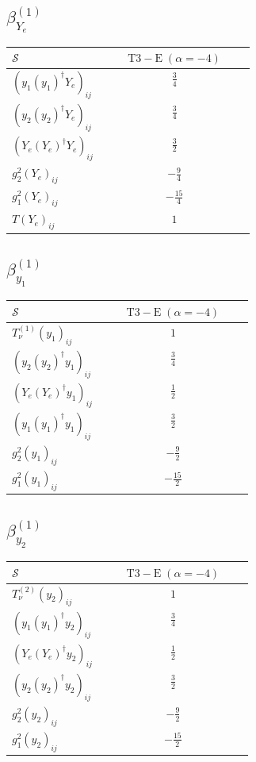 \documentclass[9pt]{article}
\begin{document}
\subsection*{$ \beta_{Y_e}^{(1)} $}
\begin{longtable}{@{}p{0.38\linewidth}c@{}}
\toprule
$\mathcal{S}$ & $ \mathrm{T3-E}\;(\alpha=-4) $ \\
\midrule
$ (y_1 (y_1)^{\dagger} Y_e)_{ij} $ & $ \frac{3}{4} $ \\
$ (y_2 (y_2)^{\dagger} Y_e)_{ij} $ & $ \frac{3}{4} $ \\
$ (Y_e (Y_e)^{\dagger} Y_e)_{ij} $ & $ \frac{3}{2} $ \\
$ g_2^2 (Y_e)_{ij} $ & $ - \frac{9}{4} $ \\
$ g_1^2 (Y_e)_{ij} $ & $ - \frac{15}{4} $ \\
$ T (Y_e)_{ij} $ & $ 1 $ \\
\bottomrule
\end{longtable}
\subsection*{$ \beta_{y_1}^{(1)} $}
\begin{longtable}{@{}p{0.38\linewidth}c@{}}
\toprule
$\mathcal{S}$ & $ \mathrm{T3-E}\;(\alpha=-4) $ \\
\midrule
$ T_{\nu}^{(1)} (y_1)_{ij} $ & $ 1 $ \\
$ (y_2 (y_2)^{\dagger} y_1)_{ij} $ & $ \frac{3}{4} $ \\
$ (Y_e (Y_e)^{\dagger} y_1)_{ij} $ & $ \frac{1}{2} $ \\
$ (y_1 (y_1)^{\dagger} y_1)_{ij} $ & $ \frac{3}{2} $ \\
$ g_2^2 (y_1)_{ij} $ & $ - \frac{9}{2} $ \\
$ g_1^2 (y_1)_{ij} $ & $ - \frac{15}{2} $ \\
\bottomrule
\end{longtable}
\subsection*{$ \beta_{y_2}^{(1)} $}
\begin{longtable}{@{}p{0.38\linewidth}c@{}}
\toprule
$\mathcal{S}$ & $ \mathrm{T3-E}\;(\alpha=-4) $ \\
\midrule
$ T_{\nu}^{(2)} (y_2)_{ij} $ & $ 1 $ \\
$ (y_1 (y_1)^{\dagger} y_2)_{ij} $ & $ \frac{3}{4} $ \\
$ (Y_e (Y_e)^{\dagger} y_2)_{ij} $ & $ \frac{1}{2} $ \\
$ (y_2 (y_2)^{\dagger} y_2)_{ij} $ & $ \frac{3}{2} $ \\
$ g_2^2 (y_2)_{ij} $ & $ - \frac{9}{2} $ \\
$ g_1^2 (y_2)_{ij} $ & $ - \frac{15}{2} $ \\
\bottomrule
\end{longtable}
\end{document}
